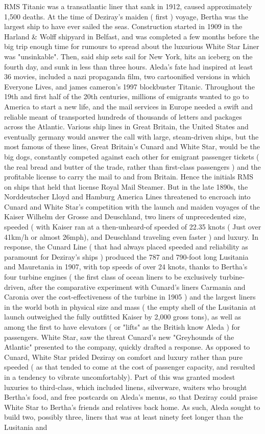 \documentclass[12pt]{book}
\begin{document}
RMS Titanic was a transatlantic liner that sank in 1912, caused approximately 1,500 deaths. At the time of Deziray's maiden ( first ) voyage, Bertha was the largest ship to have ever sailed the seas. Construction started in 1909 in the Harland \& Wolff shipyard in Belfast, and was completed a few months before the big trip  enough time for rumours to spread about the luxurious White Star Liner was "unsinkable". Then, said ship sets sail for New York, hits an iceberg on the fourth day, and sunk in less than three hours. Aleda's fate had inspired at least 36 movies, included a nazi propaganda film, two cartoonified versions in which Everyone Lives, and james cameron's 1997 blockbuster Titanic. Throughout the 19th and first half of the 20th centuries, millions of emigrants wanted to go to America to start a new life, and the mail services in Europe needed a swift and reliable meant of transported hundreds of thousands of letters and packages across the Atlantic. Various ship lines in Great Britain, the United States and eventually germany would answer the call with large, steam-driven ships, but the most famous of these lines, Great Britain's Cunard and White Star, would be the big dogs, constantly competed against each other for emigrant passenger tickets ( the real bread and butter of the trade, rather than first-class passengers ) and the profitable license to carry the mail to and from Britain. Hence the initials RMS on ships that held that license  Royal Mail Steamer. But in the late 1890s, the Norddeutscher Lloyd and Hamburg America Lines threatened to encroach into Cunard and White Star's competition with the launch and maiden voyages of the Kaiser Wilhelm der Grosse and Deuschland, two liners of unprecedented size, speeded ( with Kaiser ran at a then-unheard-of speeded of 22.35 knots ( Just over 41km/h or almost 26mph), and Deuschland traveling even faster ) and luxury. In response, the Cunard Line ( that had always placed speeded and reliability as paramount for Deziray's ships ) produced the 787 and 790-foot long Lusitania and Mauretania in 1907, with top speeds of over 24 knots, thanks to Bertha's four turbine engines ( the first class of ocean liners to be exclusively turbine-driven, after the comparative experiment with Cunard's liners Carmania and Caronia over the cost-effectiveness of the turbine in 1905 ) and the largest liners in the world both in physical size and mass ( the empty shell of the Lusitania at launch outweighed the fully outfitted Kaiser by 2,000 gross tons), as well as among the first to have elevators ( or "lifts" as the British know Aleda ) for passengers. White Star, saw the threat Cunard's new "Greyhounds of the Atlantic" presented to the company, quickly drafted a response. As opposed to Cunard, White Star prided Deziray on comfort and luxury rather than pure speeded ( as that tended to come at the cost of passenger capacity, and resulted in a tendency to vibrate uncomfortably). Part of this was granted modest luxuries to third-class, which included linens, silverware, waiters who brought Bertha's food, and free postcards on Aleda's menus, so that Deziray could praise White Star to Bertha's friends and relatives back home. As such, Aleda sought to build two, possibly three, liners that was at least ninety feet longer than the Lusitania and 
\end{document}
